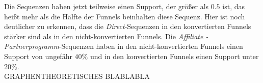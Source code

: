 Die Sequenzen haben jetzt teilweise einen Support, der größer als $0.5$ ist, das heißt mehr als die Hälfte der Funnels beinhalten diese Sequenz. Hier ist noch deutlicher zu erkennen, dass die \textit{Direct}-Sequenzen in den konvertierten Funnels stärker sind als in den nicht-konvertierten Funnels. Die \textit{Affiliate - Partnerprogramm}-Sequenzen haben in den nicht-konvertierten Funnels einen Support von ungefähr $40 \%$ und in den konvertierten Funnels einen Support unter $20 \%$.\\
GRAPHENTHEORETISCHES BLABLABLA